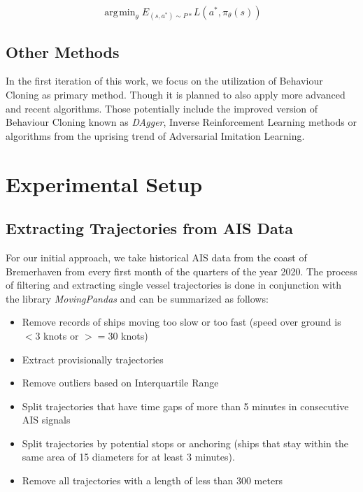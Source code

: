 \documentclass[conference]{IEEEtran}
\DeclareMathOperator*{\argmin}{\arg\!\min}
\begin{document}
\begin{equation}
\argmin_\theta E_{(s,a^*) \sim P*} L(a^*, \pi_\theta(s))
\end{equation}


\cite{alvinn}

\subsection{Other Methods}
In the first iteration of this work, we focus on the utilization of Behaviour Cloning as primary method. Though it is planned to also apply more advanced and recent algorithms. Those potentially include the improved version of Behaviour Cloning known as \textit{DAgger}, Inverse Reinforcement Learning methods or algorithms from the uprising trend of Adversarial Imitation Learning.


\section{Experimental Setup}
\subsection{Extracting Trajectories from AIS Data}
For our initial approach, we take historical AIS data from the coast of Bremerhaven from every first month of the quarters of the year 2020. The process of filtering and extracting single vessel trajectories is done in conjunction with the library \textit{MovingPandas}\cite{graser2019movingpandas} and can be summarized as follows:

\begin{itemize}
    \item Remove records of ships moving too slow or too fast (speed over ground is $<3$ knots or $>=30$ knots)
    \item Extract provisionally trajectories
    \item Remove outliers based on Interquartile Range
    \item Split trajectories that have time gaps of more than 5 minutes in consecutive AIS signals
    \item Split trajectories by potential stops or anchoring (ships that stay within the same area of 15 diameters for at least 3 minutes).
    \item Remove all trajectories with a length of less than 300 meters
\end{itemize}
\end{document}
